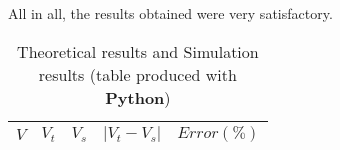 All in all, the results obtained were very satisfactory.

\begin{table}[H]
  \centering
  \begin{tabular}{|c|c|c|c|c|}
    \hline
        $V$ & $V_t$ & $V_s$ & $|V_t-V_s|$\footnotemark & $Error (\%)$\footnotemark \\
        \hline
        \hline
        
        \hline
  \end{tabular}
  \caption{Theoretical results and Simulation results (table produced with {\bf Python})}
  \label{error_res}
\end{table}




